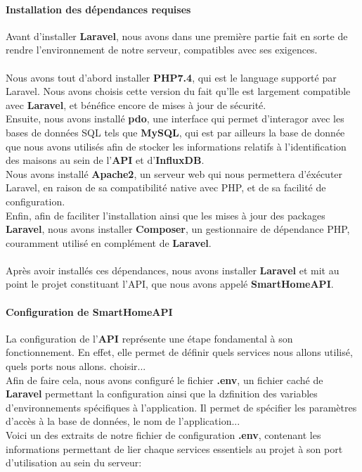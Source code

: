 \documentclass[10pt, a4paper]{report}
\begin{document}
	\paragraph{Installation des dépendances requises}
	Avant d'installer \textbf{Laravel}, nous avons dans une première partie fait en sorte de rendre l'environnement de notre serveur, compatibles avec ses exigences.\\\\
	Nous avons tout d'abord installer \textbf{PHP7.4}, qui est le language supporté par Laravel. Nous avons choisis cette version du fait qu'lle est largement compatible avec \textbf{Laravel}, et bénéfice encore de mises à jour de sécurité. \\ 
	Ensuite, nous avons installé \textbf{pdo}, une interface qui permet d'interagor avec les bases de données SQL tels que \textbf{MySQL}, qui est par ailleurs la base de donnée que nous avons utilisés afin de stocker les informations relatifs à l'identification des maisons au sein de l'\textbf{API} et d'\textbf{InfluxDB}.\\
	Nous avons installé \textbf{Apache2}, un serveur web qui nous permettera d'éxécuter Laravel, en raison de sa compatibilité native avec PHP, et de sa facilité de configuration. \\
	Enfin, afin de faciliter l'installation ainsi que les mises à jour des packages \textbf{Laravel}, nous avons installer \textbf{Composer}, un gestionnaire de dépendance PHP, couramment utilisé en complément de \textbf{Laravel}.\\\\
	Après avoir installés ces dépendances, nous avons installer \textbf{Laravel} et mit au point le projet constituant l'API, que nous avons appelé \textbf{SmartHomeAPI}.
	

	
	\paragraph{Configuration de SmartHomeAPI}
	La configuration de l'\textbf{API} représente une étape fondamental à son fonctionnement. En effet, elle permet de définir quels services nous allons utilisé, quels ports nous allons. choisir...\\
	Afin de faire cela, nous avons configuré le fichier \textbf{.env}, un fichier caché de \textbf{Laravel} permettant la configuration ainsi que la dzfinition des variables d'environnements spécifiques à l'application. Il permet de spécifier les paramètres d'accès à la base de données, le nom de l'application...\\
	Voici un des extraits de notre fichier de configuration \textbf{.env}, contenant les informations permettant de lier chaque services essentiels au projet à son port d'utilisation au sein du serveur:
	
\end{document}
